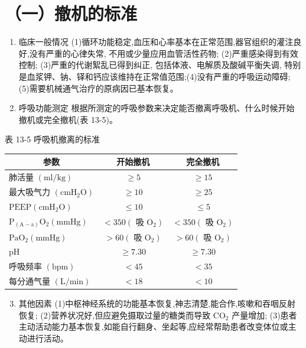 \documentclass[10pt]{article}
\begin{document}
\section*{（一）撤机的标准}
\begin{enumerate}
  \item 临床一般情况 (1)循环功能稳定,血压和心率基本在正常范围,器官组织的灌注良好,没有严重的心律失常, 不用或少量应用血管活性药物; (2)严重感染得到有效控制; (3)严重的代谢絮乱已得到纠正, 包括体液、电解质及酸碱平衡失调, 特别是血浆钾、钠、铎和钙应该维持在正常值范围;(4)没有严重的呼吸运动障碍; (5)需要机械通气治疗的原病因已基本恢复。

  \item 呼吸功能测定 根据所测定的呼吸参数来决定能否撤离呼吸机、什么时候开始撤机或完全撤机(表 13-5)。

\end{enumerate}

表 13-5 呼吸机撤离的标准

\begin{center}
\begin{tabular}{lcc}
\hline
\multicolumn{1}{c}{参数} & 开始撤机 & 完全撤机 \\
\hline
肺活量 $(\mathrm{ml} / \mathrm{kg})$ & $\geqslant 5$ & $\geqslant 15$ \\
最大吸气力 $\left(\mathrm{cmH}_{2} \mathrm{O}\right)$ & $\geqslant 10$ & $\geqslant 25$ \\
$\mathrm{PEEP}\left(\mathrm{cmH}_{2} \mathrm{O}\right)$ & $\leqslant 10$ & $\leqslant 5$ \\
$\mathrm{P}_{(\mathrm{A}-\mathrm{a})} \mathrm{O}_{2}(\mathrm{mmHg})$ & $<350\left(\right.$ 吸 $\left.\mathrm{O}_{2}\right)$ & $<350\left(\right.$ 吸 $\left.\mathrm{O}_{2}\right)$ \\
$\mathrm{PaO}_{2}(\mathrm{mmHg})$ & $>60\left(\right.$ 吸 $\left.\mathrm{O}_{2}\right)$ & $>60\left(\right.$ 吸 $\left.\mathrm{O}_{2}\right)$ \\
$\mathrm{pH}$ & $\geqslant 7.30$ & $\geqslant 7.30$ \\
呼吸频率 $(\mathrm{bpm})$ & $<45$ & $<35$ \\
每分通气量 $(\mathrm{L} / \mathrm{min})$ & $<18$ & $<10$ \\
\hline
\end{tabular}
\end{center}

\begin{enumerate}
  \setcounter{enumi}{2}
  \item 其他因素 (1)中枢神经系统的功能基本恢复,神志清楚,能合作,咳嗽和吞咽反射恢复; (2)营养状况好,但应避免摄取过量的糖类而导致 $\mathrm{CO}_{2}$ 产量增加; (3)患者主动活动能力基本恢复,如能自行翻身、坐起等,应经常帮助患者改变体位或主动进行活动。
\end{enumerate}
\end{document}
